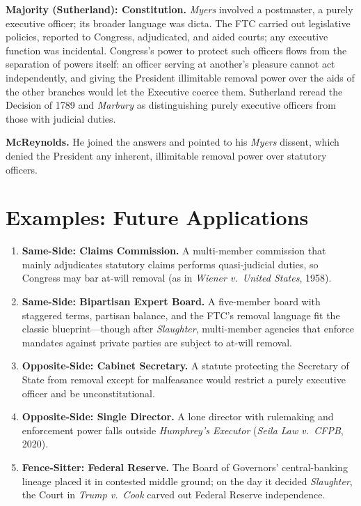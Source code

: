 \documentclass[12pt]{article}
\begin{document}
\textbf{Majority (Sutherland): Constitution.} \textit{Myers} involved a postmaster, a purely executive officer; its broader language was dicta. The FTC carried out legislative policies, reported to Congress, adjudicated, and aided courts; any executive function was incidental. Congress's power to protect such officers flows from the separation of powers itself: an officer serving at another's pleasure cannot act independently, and giving the President illimitable removal power over the aids of the other branches would let the Executive coerce them. Sutherland reread the Decision of 1789 and \textit{Marbury} as distinguishing purely executive officers from those with judicial duties.

\textbf{McReynolds.} He joined the answers and pointed to his \textit{Myers} dissent, which denied the President any inherent, illimitable removal power over statutory officers.

\section{Examples: Future Applications}

\begin{enumerate}
\item \textbf{Same-Side: Claims Commission.} A multi-member commission that mainly adjudicates statutory claims performs quasi-judicial duties, so Congress may bar at-will removal (as in \textit{Wiener v.\ United States}, 1958).
\item \textbf{Same-Side: Bipartisan Expert Board.} A five-member board with staggered terms, partisan balance, and the FTC's removal language fit the classic blueprint---though after \textit{Slaughter}, multi-member agencies that enforce mandates against private parties are subject to at-will removal.
\item \textbf{Opposite-Side: Cabinet Secretary.} A statute protecting the Secretary of State from removal except for malfeasance would restrict a purely executive officer and be unconstitutional.
\item \textbf{Opposite-Side: Single Director.} A lone director with rulemaking and enforcement power falls outside \textit{Humphrey's Executor} (\textit{Seila Law v.\ CFPB}, 2020).
\item \textbf{Fence-Sitter: Federal Reserve.} The Board of Governors' central-banking lineage placed it in contested middle ground; on the day it decided \textit{Slaughter}, the Court in \textit{Trump v.\ Cook} carved out Federal Reserve independence.
\end{enumerate}
\end{document}
